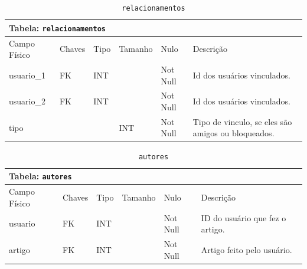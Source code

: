 \documentclass[12pt,a4paper]{article}
\begin{document}
\begin{center}
\begin{table}[h!]
	\caption{\texttt{relacionamentos}}
	\label{tabela:relacionamentos}
	\begin{tabular}{|p{2.3cm}|p{1.2cm}|p{1.8cm}|p{1.5cm}|p{1cm}|p{6cm}|}\hline	
		\multicolumn{6}{|p{16cm}|}{\cellcolor{cinzaClaro}  \centering Tabela: \texttt{relacionamentos}} \\ \hline %
		{\small Campo Físico}   & {\small Chaves} & {\small Tipo} & {\small Tamanho} & {\small Nulo} & {\small Descrição}\\\hline %
		
		{\tiny usuario\_1} & {\tiny FK} & {\tiny INT} & {\tiny } & {\tiny Not Null} &{\tiny Id dos usuários vinculados.}\\\hline
		{\tiny usuario\_2} & {\tiny FK} & {\tiny INT} & {\tiny } & {\tiny Not Null} &{\tiny Id dos usuários vinculados.}\\\hline
		{\tiny tipo} & {\tiny } & {\tiny } & {\tiny INT} & {\tiny Not Null} &{\tiny Tipo de vinculo, se eles são amigos ou bloqueados.}\\\hline
		
			
	\end{tabular}
\end{table}	
\end{center}

\begin{center}
\begin{table}[h!]
	\caption{\texttt{autores}}
	\label{tabela:autores}
	\begin{tabular}{|p{2.3cm}|p{1.2cm}|p{1.8cm}|p{1.5cm}|p{1cm}|p{6cm}|}\hline	
		\multicolumn{6}{|p{16cm}|}{\cellcolor{cinzaClaro}  \centering Tabela: \texttt{autores}} \\ \hline %
		{\small Campo Físico}   & {\small Chaves} & {\small Tipo} & {\small Tamanho} & {\small Nulo} & {\small Descrição}\\\hline %
		
		{\tiny usuario} & {\tiny FK} & {\tiny INT} & {\tiny } & {\tiny Not Null} &{\tiny ID do usuário que fez o artigo.}\\\hline
		{\tiny artigo} & {\tiny FK} & {\tiny INT} & {\tiny } & {\tiny Not Null} &{\tiny Artigo feito pelo usuário.}\\\hline
			
	\end{tabular}
\end{table}	
\end{center}
\end{document}
